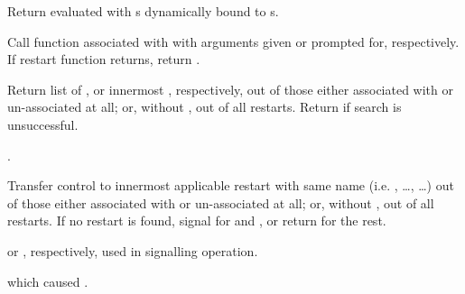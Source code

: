 \begin{LIST}{1cm}
  {
  Return  evaluated with s 
  dynamically bound to s.
  }

  {
  Call function associated with  with arguments given or
  prompted for, respectively. If restart function returns, return .
  }

  {
  Return list of , or innermost 
  , respectively, out of those either associated
  with  or un-associated at all; or, without
  , out of all restarts. Return \retval{\NIL} if search
  is unsuccessful.
  }

  {
  .
  }

  {
  Transfer control to innermost applicable restart with same name
  (i.e. , \ldots,  \ldots) out of those either associated
  with  or un-associated at all; or, without
  , out of all restarts. If no restart is found,
  signal  for  and ,
  or return \retval{\NIL} for the rest.
  }

  {
   or , respectively, used in signalling operation.
  }

  {
   which caused .
  }


\end{LIST}
